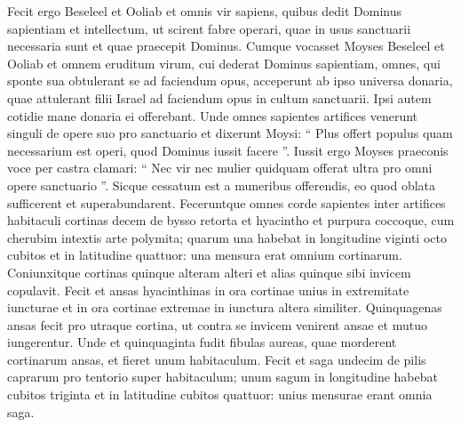 \begin{biblechapter}
\begin{biblechapter}
\begin{biblechapter}
\begin{biblechapter}
\begin{biblechapter}
\begin{biblechapter}
\begin{biblechapter}
\begin{biblechapter}
\begin{biblechapter}
\begin{biblechapter}
\begin{biblechapter}
\begin{biblechapter}
\begin{biblechapter}
\begin{biblechapter}
\begin{biblechapter}
\begin{biblechapter}
\begin{biblechapter}
\begin{biblechapter}
\begin{biblechapter}
\begin{biblechapter}
\begin{biblechapter}
\begin{biblechapter}
\begin{biblechapter}
\begin{biblechapter}
\begin{biblechapter}
\begin{biblechapter}
\begin{biblechapter}
\begin{biblechapter}
\begin{biblechapter}
\begin{biblechapter}
\begin{biblechapter}
\begin{biblechapter}
\begin{biblechapter}
\begin{biblechapter}
\begin{biblechapter}
\begin{biblechapter}
\verse Fecit ergo Beseleel et Ooliab et omnis vir sapiens, quibus dedit Dominus sapientiam et intellectum, ut scirent fabre operari, quae in usus sanctuarii necessaria sunt et quae praecepit Dominus.
 \verse Cumque vocasset Moyses Beseleel et Ooliab et omnem eruditum virum, cui dederat Dominus sapientiam, omnes, qui sponte sua obtulerant se ad faciendum opus, 
\verse acceperunt ab ipso universa donaria, quae attulerant filii Israel ad faciendum opus in cultum sanctuarii. Ipsi autem cotidie mane donaria ei offerebant. 
\verse Unde omnes sapientes artifices venerunt singuli de opere suo pro sanctuario 
 \verse et dixerunt Moysi: “ Plus offert populus quam necessarium est operi, quod Dominus iussit facere ”. 
\verse Iussit ergo Moyses praeconis voce per castra clamari: “ Nec vir nec mulier quidquam offerat ultra pro omni opere sanctuario ”. Sicque cessatum est a muneribus offerendis, 
\verse eo quod oblata sufficerent et superabundarent.
 \verse Feceruntque omnes corde sapientes inter artifices habitaculi cortinas decem de bysso retorta et hyacintho et purpura coccoque, cum cherubim intextis arte polymita; 
\verse quarum una habebat in longitudine viginti octo cubitos et in latitudine quattuor: una mensura erat omnium cortinarum. 
\verse Coniunxitque cortinas quinque alteram alteri et alias quinque sibi invicem copulavit. 
\verse Fecit et ansas hyacinthinas in ora cortinae unius in extremitate iuncturae et in ora cortinae extremae in iunctura altera similiter. 
\verse Quinquagenas ansas fecit pro utraque cortina, ut contra se invicem venirent ansae et mutuo iungerentur. 
\verse Unde et quinquaginta fudit fibulas aureas, quae morderent cortinarum ansas, et fieret unum habitaculum. 
\verse Fecit et saga undecim de pilis caprarum pro tentorio super habitaculum; 
\verse unum sagum in longitudine habebat cubitos triginta et in latitudine cubitos quattuor: unius mensurae erant omnia saga. 

\end{biblechapter}
\end{biblechapter}
\end{biblechapter}
\end{biblechapter}
\end{biblechapter}
\end{biblechapter}
\end{biblechapter}
\end{biblechapter}
\end{biblechapter}
\end{biblechapter}
\end{biblechapter}
\end{biblechapter}
\end{biblechapter}
\end{biblechapter}
\end{biblechapter}
\end{biblechapter}
\end{biblechapter}
\end{biblechapter}
\end{biblechapter}
\end{biblechapter}
\end{biblechapter}
\end{biblechapter}
\end{biblechapter}
\end{biblechapter}
\end{biblechapter}
\end{biblechapter}
\end{biblechapter}
\end{biblechapter}
\end{biblechapter}
\end{biblechapter}
\end{biblechapter}
\end{biblechapter}
\end{biblechapter}
\end{biblechapter}
\end{biblechapter}
\end{biblechapter}
